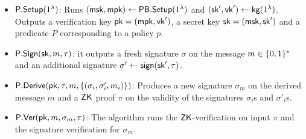\documentclass[11pt]{llncs}
\begin{document}
\begin{itemize}
\item ${\sf P.Setup}(1^\lambda)$: Runs $({\sf msk}, {\sf mpk}) \gets {\sf PB.Setup}(1^\lambda)$ and $({\sf sk}', {\sf vk}') \gets {\sf kg}(1^{\lambda})$.  Outputs a verification key ${\sf pk}=({\sf mpk}, {\sf vk}')$, a secret key ${\sf sk}=({\sf msk}, {\sf sk}')$ and a predicate $P$
corresponding to a policy $p$.


\item ${\sf P.Sign}({\sf sk}, m, \tau)$: it outputs a fresh signature $\sigma$ on the message $m \in \{0,1\}^*$ and an additional signature $\sigma' \gets {\sf sign}({\sf sk}', \tau)$.

\item ${\sf P.Derive}({\sf pk}, \tau, m, \lbrace (\sigma_i, \sigma'_i, m_i) \rbrace)$: Produces a new signature $\sigma_m$ on the derived message $m$ and a ${\sf ZK}$ proof $\pi$ on the validity of the signatures $\sigma_i$s and $\sigma'_i$s.

\item ${\sf P.Ver}({\sf pk}, m, \sigma_m, \pi)$: The algorithm runs the ${\sf ZK}$-verification on input $\pi$ and the signature verification for $\sigma_m$.

\end{itemize}

 

%
%
\end{document}
